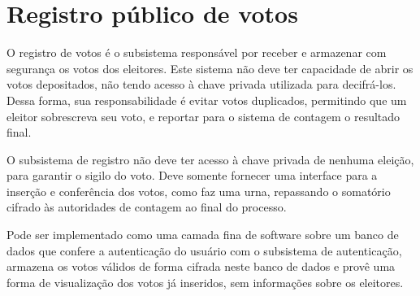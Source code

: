\section{Registro público de votos}
\label{sect:registro}

O registro de votos é o subsistema responsável por receber e armazenar com
segurança os votos dos eleitores. Este sistema não deve ter capacidade de abrir
os votos depositados, não tendo acesso à chave privada utilizada para
decifrá-los. Dessa forma, sua responsabilidade é evitar votos duplicados,
permitindo que um eleitor sobrescreva seu voto, e reportar para o sistema de
contagem o resultado final.

O subsistema de registro não deve ter acesso à chave privada de nenhuma
eleição, para garantir o sigilo do voto. Deve somente fornecer uma interface
para a inserção e conferência dos votos, como faz uma urna, repassando o
somatório cifrado às autoridades de contagem ao final do processo.

Pode ser implementado como uma camada fina de software sobre um banco de dados
que confere a autenticação do usuário com o subsistema de autenticação,
armazena os votos válidos de forma cifrada neste banco de dados e provê uma
forma de visualização dos votos já inseridos, sem informações sobre os
eleitores.
